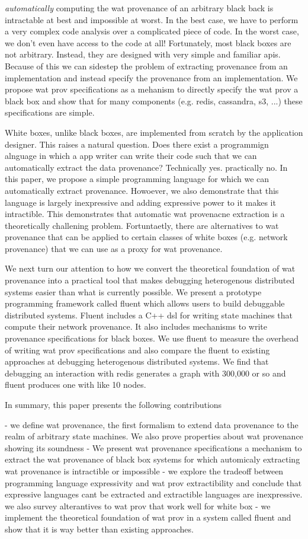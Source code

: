 \emph{automatically} computing the wat provenance of an arbitrary black back is intractable at best and impossible at worst. In the best case, we have to perform a very complex code analysis over a complicated piece of code. In the worst case, we don't even have access to the code at all! Fortunately, most black boxes are not arbitrary. Instead, they are designed with very simple and familiar apis. Because of this we can sidestep the problem of extracting provenance from an implementation and instead specify the provenance from an implementation. We propose wat prov specifications as a mehanism to directly specify the wat prov a black box and show that for many components (e.g. redis, cassandra, s3, ...) these specifications are simple.

White boxes, unlike black boxes, are implemented from scratch by the application designer. This raises a natural question. Does there exist a programmign alnguage in which a app writer can write their code such that we can automatically extract the data provenance? Technically yes. practically no. In this paper, we propose a simple programming language for which we can automatically extract provenance. Howoever, we also demonstrate that this language is largely inexpressive and adding expressive power to it makes it intractible. This demonstrates that automatic wat provenacne extraction is a theoretically challening problem. Fortuntaetly, there are alternatives to wat provenance that can be applied to certain classes of white boxes (e.g. network provenance) that we can use as a proxy for wat provenance.

We next turn our attention to how we convert the theoretical foundation of wat provenance into a practical tool that makes debugging heterogenous distributed systems easier than what is currently possible. We present a prototype programming framework called fluent which allows users to build debuggable distributed systems. Fluent includes a C++ dsl for writing state machines that compute their network provenance. It also includes mechanisms to write provenance specifications for black boxes. We use fluent to measure the overhead of writing wat prov specifications and also compare the fluent to existing approaches at debugging heterogenous distributed systems. We find that debugging an interaction with redis generates a graph with 300,000 or so and fluent produces one with like 10 nodes.

In summary, this paper presents the following contributions

- we define wat provenance, the first formalism to extend data provenance to the realm of arbitrary state machines. We also prove properties about wat provenance showing its soundness
- We present wat provenance specifications a mechanism to extract the wat provenance of black box systems for which automicaly extracting wat provenance is intractible or impossible
- we explore the tradeoff between programming language expressivity and wat prov extractibility and conclude that expressive languages cant be extracted and extractible languages are inexpressive. we also survey alterantives to wat prov that work well for white box
- we implement the theoretical foundation of wat prov in a system called fluent and show that it is way better than existing approaches.
